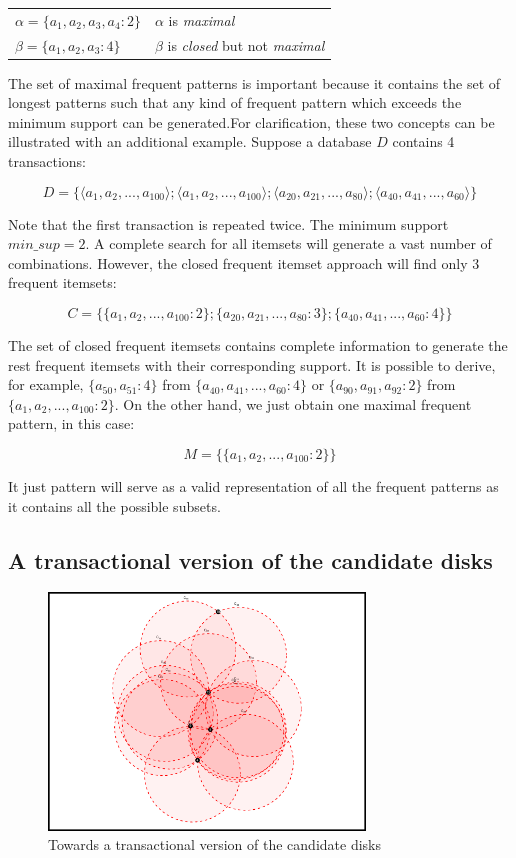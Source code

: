 \documentclass[10pt]{scrartcl}
\begin{document}
\vspace{2mm}
\begin{tabular}{l l}
$\alpha = \{ a_1, a_2, a_3, a_4 : 2\}$ & $\alpha$ is \textit{maximal} \\
$\beta = \{ a_1, a_2, a_3 : 4\}$ & $\beta$ is \textit{closed} but not \textit{maximal} \\
\end{tabular}
\vspace{2mm}

The set of maximal frequent patterns is important because it contains the set of longest patterns such that any kind of frequent pattern which exceeds the minimum support can be generated.For clarification, these two concepts can be illustrated with an additional example.  Suppose a database $D$ contains 4 transactions:

$$ D = \{ \langle a_1, a_2, ..., a_{100} \rangle; \langle a_1, a_2, ..., a_{100} \rangle; \langle a_{20}, a_{21}, ..., a_{80} \rangle; \langle a_{40}, a_{41}, ..., a_{60} \rangle \} $$

Note that the first transaction is repeated twice. The minimum support $min\_sup = 2$. A complete search for all itemsets will generate a vast number of combinations. However,
the closed frequent itemset approach will find only 3 frequent itemsets:

$$ C = \{ \{ a_1, a_2, ..., a_{100} : 2 \};\{ a_{20},a_{21}, ..., a_{80} : 3 \};\{ a_{40},a_{41}, ..., a_{60} : 4 \} \} $$

The set of closed frequent itemsets contains complete information to generate the rest frequent itemsets with their corresponding support. It is possible to derive, for example,
$\{a_{50}, a_{51} : 4\}$ from $\{a_{40}, a_{41} , ..., a_{60} : 4\}$ or $\{a_{90}, a_{91}, a_{92} : 2\}$ from $\{a_1, a_2, ..., a_{100} : 2\}$.
On the other hand, we just obtain one maximal frequent pattern, in this case:

$$ M = \{ \{ a_1, a_2, ..., a_{100} : 2 \} \} $$

It just pattern will serve as a valid representation of all the frequent patterns as it contains all the possible subsets.

\subsection*{A transactional version of the candidate disks}

\begin{figure}   
  \centering 
  \includegraphics[width=0.75\textwidth]{../Viz/zoom1}
  \caption[]{{\small Towards a transactional version of the candidate disks}}    
  \label{fig:candidates}
\end{figure}
    
\end{document}
